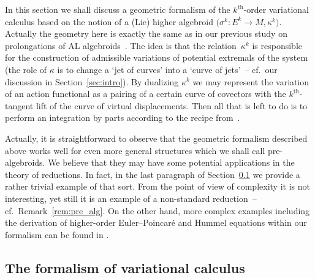 \documentclass[10pt,a4paper]{amsart}
\newcommand{\thh}[1]{#1^{\mathrm{th}}} %
\newcommand{\ra}{\rightarrow}
\newcommand{\prealg}{pre-algebroid} %
\numberwithin{equation}{section}
\theoremstyle{definition}
\begin{document}
In this section we shall discuss a geometric formalism of the $\thh{k}$-order variational calculus based on the notion of a (Lie) higher algebroid $\big(\sigma^k\colon E^k\ra M,\kappa^k\big)$. Actually the geometry here is exactly the same as in our previous study on prolongations of AL algebroids~\cite{MJ_MR_prototypes}. The idea is that the relation~$\kappa^k$ is responsible for the construction of admissible variations of potential extremals of the system (the role of $\kappa$ is to change a `jet of curves' into a `curve of jets'~-- cf.\ our discussion in Section~\ref{sec:intro}). By dualizing $\kappa^k$ we may represent the variation of an action functional as a pairing of a certain curve of covectors with the $\thh{k}$-tangent lift of the curve of virtual displacements. Then all that is left to do is to perform an integration by parts according to the recipe from~\cite{MJ_MR_higher_var_calc_2013}.

Actually, it is straightforward to observe that the geometric formalism described above works well for even more general structures which we shall call \prealg s. We believe that they may have some potential applications in the theory of reductions. In fact, in the last paragraph of Section~\ref{ssec:var_calc} we provide a rather trivial example of that sort. From the point of view of complexity it is not interesting, yet still it is an example of a non-standard reduction~-- cf.\ Remark~\ref{rem:pre_alg}. On the other hand, more complex examples including the derivation of higher-order Euler--Poincar\'e and Hummel equations within our formalism can be found in \cite{MJ_MR_prototypes}.

\subsection{The formalism of variational calculus}\label{ssec:var_calc}
\end{document}
